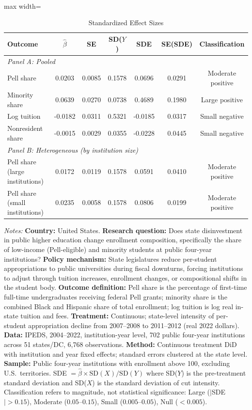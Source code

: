 \begin{table}[htbp]
\centering
\caption{Standardized Effect Sizes}
\label{tab:sde}
\small
\begin{adjustbox}{max width=\textwidth}
\begin{tabular}{lcccccc}
\toprule
Outcome & $\hat{\beta}$ & SE & SD($Y$) & SDE & SE(SDE) & Classification \\
\midrule
\multicolumn{7}{l}{\textit{Panel A: Pooled}} \\
Pell share & 0.0203 & 0.0085 & 0.1578 & 0.0696 & 0.0291 & Moderate positive \\
Minority share & 0.0639 & 0.0270 & 0.0738 & 0.4689 & 0.1980 & Large positive \\
Log tuition & -0.0182 & 0.0311 & 0.5321 & -0.0185 & 0.0317 & Small negative \\
Nonresident share & -0.0015 & 0.0029 & 0.0355 & -0.0228 & 0.0445 & Small negative \\
\midrule
\multicolumn{7}{l}{\textit{Panel B: Heterogeneous (by institution size)}} \\
Pell share (large institutions) & 0.0172 & 0.0119 & 0.1578 & 0.0591 & 0.0410 & Moderate positive \\
Pell share (small institutions) & 0.0235 & 0.0058 & 0.1578 & 0.0806 & 0.0199 & Moderate positive \\
\bottomrule
\end{tabular}
\end{adjustbox}
\begin{tablenotes}[flushleft]
\small
\item \textit{Notes:} \textbf{Country:} United States. \textbf{Research question:} Does state disinvestment in public higher education change enrollment composition, specifically the share of low-income (Pell-eligible) and minority students at public four-year institutions? \textbf{Policy mechanism:} State legislatures reduce per-student appropriations to public universities during fiscal downturns, forcing institutions to adjust through tuition increases, enrollment changes, or compositional shifts in the student body. \textbf{Outcome definition:} Pell share is the percentage of first-time full-time undergraduates receiving federal Pell grants; minority share is the combined Black and Hispanic share of total enrollment; log tuition is log real in-state tuition and fees. \textbf{Treatment:} Continuous; state-level intensity of per-student appropriation decline from 2007--2008 to 2011--2012 (real 2022 dollars). \textbf{Data:} IPEDS, 2004--2022, institution-year level, 702 public four-year institutions across 51 states/DC, 6,768 observations. \textbf{Method:} Continuous treatment DiD with institution and year fixed effects; standard errors clustered at the state level. \textbf{Sample:} Public four-year institutions with enrollment above 100, excluding U.S.\ territories. SDE $= \hat{\beta} \times \text{SD}(X) / \text{SD}(Y)$ where SD($Y$) is the pre-treatment standard deviation and SD($X$) is the standard deviation of cut intensity. Classification refers to magnitude, not statistical significance: Large ($|$SDE$| > 0.15$), Moderate ($0.05$--$0.15$), Small ($0.005$--$0.05$), Null ($< 0.005$).
\end{tablenotes}
\end{table}
